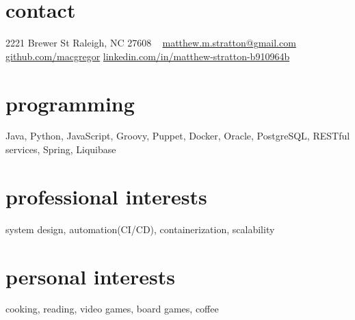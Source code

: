 
\begin{aside} %
\section{contact}
2221 Brewer St
Raleigh, NC 27608
~
\href{mailto:matthew.m.stratton@gmail.com}{\small{matthew.m.stratton@gmail.com}}
\href{https://github.com/macgregor}{github.com/macgregor}
\href{https://www.linkedin.com/in/matthew-stratton-b910964b}{\small{linkedin.com/in/matthew-stratton-b910964b}}
\section{programming}
Java, Python, JavaScript, Groovy, Puppet, Docker, Oracle, PostgreSQL, RESTful services, Spring, Liquibase
\section{professional interests}
system design, automation(CI/CD), containerization, scalability
~
\section{personal interests}
 cooking, reading, video games, board games, coffee
\end{aside}
